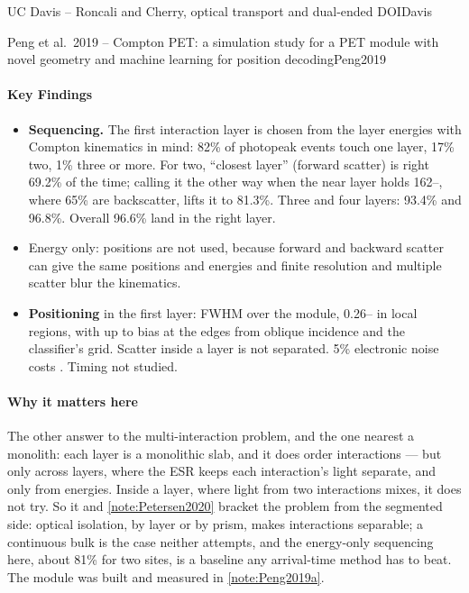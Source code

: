 \begin{programnote}{UC Davis -- Roncali and Cherry, optical transport and dual-ended DOI}{Davis}
\begin{papernote}{Peng et al.\ 2019 -- Compton PET: a simulation study for a PET module with novel geometry and machine learning for position decoding}{Peng2019}
\paragraph{Key Findings}
\begin{itemize}
	\item \textbf{Sequencing.} The first interaction layer is chosen from the
		layer energies with Compton kinematics in mind: 82\% of photopeak events
		touch one layer, 17\% two, 1\% three or more. For two, ``closest layer''
		(forward scatter) is right 69.2\% of the time; calling it the other way
		when the near layer holds 162--, where 65\% are backscatter,
		lifts it to 81.3\%. Three and four layers: 93.4\% and 96.8\%. Overall
		96.6\% land in the right  layer.
	\item Energy only: positions are not used, because forward and backward
		scatter can give the same positions and energies and finite resolution
		and multiple scatter blur the kinematics.
	\item \textbf{Positioning} in the first layer:  FWHM over the
		module, 0.26-- in local regions, with up to  bias
		at the edges from oblique incidence and the classifier's grid.
		Scatter inside a layer is not separated. 5\% electronic noise costs
		. Timing not studied.
\end{itemize}

\paragraph{Why it matters here}
The other answer to the multi-interaction problem, and the one nearest a
monolith: each layer is a monolithic slab, and it does order interactions ---
but only across layers, where the ESR keeps each interaction's light separate,
and only from energies. Inside a layer, where light from two interactions
mixes, it does not try. So it and \ref{note:Petersen2020} bracket the problem
from the segmented side: optical isolation, by layer or by prism, makes
interactions separable; a continuous bulk is the case neither attempts, and
the energy-only sequencing here, about 81\% for two sites, is a baseline
any arrival-time method has to beat.
The module was built and measured in \ref{note:Peng2019a}.


\end{papernote}
\end{programnote}

